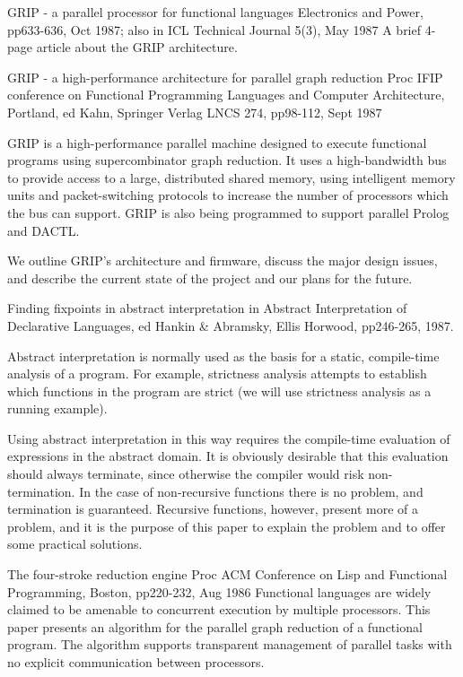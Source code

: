 {GRIP - a parallel processor for functional languages}
{Electronics and Power, pp633-636, Oct 1987;
also in ICL Technical Journal 5(3), May 1987}
{
A brief 4-page article about the GRIP architecture.
}

{GRIP - a high-performance architecture for parallel graph reduction}
{Proc IFIP conference on Functional Programming Languages and 
Computer Architecture, Portland,
ed Kahn, Springer Verlag LNCS 274, pp98-112, Sept 1987}
{
GRIP is a high-performance parallel machine designed to execute
functional programs using supercombinator graph reduction.
It uses a high-bandwidth bus to provide access to a
large, distributed shared memory, using intelligent memory units and
packet-switching protocols to increase the number of processors
which the bus can support.
GRIP is also being programmed to support parallel Prolog and
DACTL.

We outline GRIP's architecture and firmware, discuss the major design
issues, and describe the current state of the project and
our plans for the future.
}

{Finding fixpoints in abstract interpretation} 
{in Abstract Interpretation of Declarative Languages,
ed Hankin \& Abramsky, Ellis Horwood, pp246-265, 1987.}
{
Abstract interpretation is normally used as the basis for
a static, compile-time analysis of a program.
For example, strictness analysis attempts to establish which
functions in the program are strict (we will use strictness
analysis as a running example).

Using abstract interpretation in this way requires the
compile-time evaluation of expressions in the abstract domain.
It is obviously desirable that this evaluation should
always terminate, since otherwise the compiler would risk
non-termination.
In the case of non-recursive functions there is no problem, and
termination is guaranteed.
Recursive functions, however, present more of a problem, and it
is the purpose of this paper to explain the problem and to
offer some practical solutions.
}

{The four-stroke reduction engine}
{Proc ACM Conference on Lisp and Functional Programming,
Boston, pp220-232, Aug 1986}
{
Functional languages are widely claimed to be amenable to concurrent
execution by multiple processors.  This paper presents an algorithm for
the parallel graph reduction of a functional program.
The algorithm supports transparent management of parallel 
tasks with no explicit
communication between processors.
}

